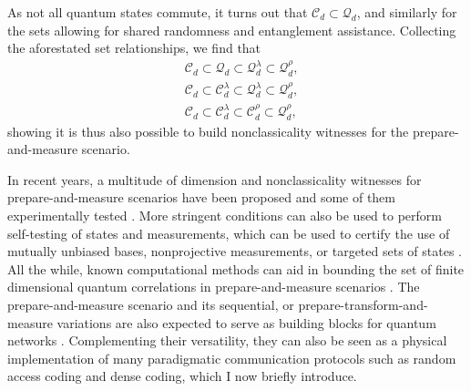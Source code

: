             As not all quantum states commute, it turns out that $\mathcal{C}_d \subset \mathcal{Q}_d$, and similarly for the sets allowing for shared randomness and entanglement assistance. Collecting the aforestated set relationships, we find that 
            \begin{align}
                &\mathcal{C}_d \subset \mathcal{Q}_d \subset \mathcal{Q}_d^\lambda \subset \mathcal{Q}_d^\rho , \\
                &\mathcal{C}_d \subset \mathcal{C}_d^\lambda \subset \mathcal{Q}_d^\lambda \subset \mathcal{Q}_d^\rho, \\
                &\mathcal{C}_d \subset \mathcal{C}_d^\lambda \subset \mathcal{C}_d^\rho \subset \mathcal{Q}_d^\rho ,
            \end{align}
            showing it is thus also possible to build nonclassicality witnesses for the prepare-and-measure scenario.
            
            \ornamentbreak
            
            In recent years, a multitude of dimension and nonclassicality witnesses for prepare-and-measure scenarios have been proposed \cite{gallego_pam_2010,brunner_dimension_2013,sikora_dimension_2016,dallarno_robustness_2012,de_vicente_bound_2019,bowles_certifying_2014,wehner_lower_2008} and some of them experimentally tested \cite{hendrych_experimental_2012,ahrens_experimental_2012,dambrosio_highdimensional_2014}. More stringent conditions can also be used to perform self-testing of states and measurements, which can be used to certify the use of mutually unbiased bases, nonprojective measurements, or targeted sets of states \cite{tavakoli_selftesting_2018,farkas_selftesting_2019,wei_selftesting_2019,mironowicz_fouroutcome_2019,tavakoli_selftesting_2020,miklin_universal_2021,moreno_pamdense_2021}. All the while, known computational methods can aid in bounding the set of finite dimensional quantum correlations in prepare-and-measure scenarios \cite{navascues_bounding_2015,navascues_characterizing_2015}. The prepare-and-measure scenario and its sequential, or prepare-transform-and-measure variations \cite{mohan_sequential_2019,miklin_sequentialunsharp_2020} are also expected to serve as building blocks for quantum networks \cite{bowles_pamnetworks_2015,wang_pamnetworks_2019}. Complementing their versatility, they can also be seen as a physical implementation of many paradigmatic communication protocols such as random access coding and dense coding, which I now briefly introduce.


